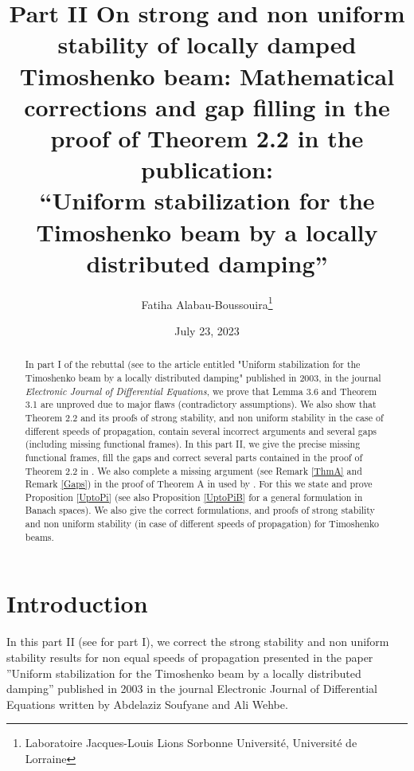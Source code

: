 \documentclass[10pt, english]{article}
\begin{document}
\title{Part II On strong and non uniform stability of locally damped Timoshenko beam:
Mathematical corrections and gap filling in the proof of Theorem 2.2 in the publication:
\\
\enquote{Uniform stabilization for the Timoshenko beam by a locally distributed
damping} \vspace{0.2cm}
}
\author{Fatiha Alabau-Boussouira\footnote{Laboratoire Jacques-Louis Lions Sorbonne Universit\'{e}, Universit\'{e} de Lorraine} 
}


\date{July 23, 2023}
\maketitle {}
\tableofcontents
\begin{abstract}
In part I of the rebuttal (see \cite{AB2023I} to the article \cite{SW2003} entitled "Uniform stabilization for the Timoshenko beam by a locally distributed damping" published in 2003, in the journal
{\it Electronic Journal of Differential Equations}, we prove that Lemma 3.6 and Theorem 3.1 are unproved due to major flaws (contradictory assumptions). We also show that Theorem 2.2 and its proofs of strong stability, and non uniform stability in the case of different speeds of propagation, contain several incorrect arguments and several gaps (including missing functional frames). In this part II, we give the precise missing functional frames, fill the gaps and correct several parts contained in the proof of Theorem 2.2 in \cite{SW2003}. We also complete a missing argument (see Remark \ref {ThmA} and Remark \ref{Gaps}) in the proof of Theorem A in \cite{NRL1986} used by \cite{SW2003}. For this we state and prove Proposition \ref{UptoPi} (see also Proposition \ref{UptoPiB} for a general formulation in Banach spaces). We also give the correct formulations, and proofs of strong stability and non uniform stability (in case of different speeds of propagation) for Timoshenko beams.
\end{abstract}
\section{Introduction}
In this part II (see \cite{AB2023I} for part I), we correct the strong stability and non uniform stability results for non equal speeds of propagation presented in the paper ”Uniform stabilization for the Timoshenko beam by a locally distributed damping” published in 2003 in the journal Electronic Journal of Differential Equations written by Abdelaziz Soufyane and Ali Wehbe.
\end{document}
